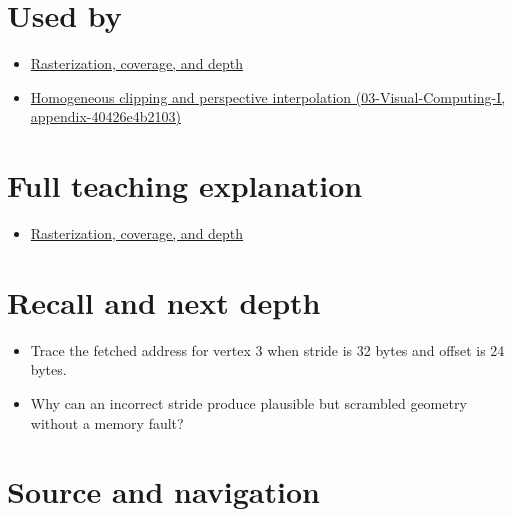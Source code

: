 \section{Used by}\label{appendix-749ba51a6c25-used-by}

\begin{itemize}
\tightlist
\item
  \href{Continuous\%20Notes/University\%20-\%20Worlds,\%20Images\%20and\%20Inference\%20-\%20Graphics,\%20Vision\%20and\%20Photography\#Rasterization,\%20coverage,\%20and\%20depth}{Rasterization, coverage, and depth}
\item
  \href{../03-Visual-Computing-I/main.pdf\#nameddest=appendix-40426e4b2103}{Homogeneous clipping and perspective interpolation (03-Visual-Computing-I, appendix-40426e4b2103)}
\end{itemize}

\section{Full teaching explanation}\label{appendix-749ba51a6c25-full-teaching-explanation}

\begin{itemize}
\tightlist
\item
  \href{Continuous\%20Notes/University\%20-\%20Worlds,\%20Images\%20and\%20Inference\%20-\%20Graphics,\%20Vision\%20and\%20Photography\#Rasterization,\%20coverage,\%20and\%20depth}{Rasterization, coverage, and depth}
\end{itemize}

\section{Recall and next depth}\label{appendix-749ba51a6c25-recall-and-next-depth}

\begin{itemize}
\tightlist
\item
  Trace the fetched address for vertex 3 when stride is 32 bytes and offset is 24 bytes.
\item
  Why can an incorrect stride produce plausible but scrambled geometry without a memory fault?
\end{itemize}

\section{Source and navigation}\label{appendix-749ba51a6c25-source-and-navigation}

